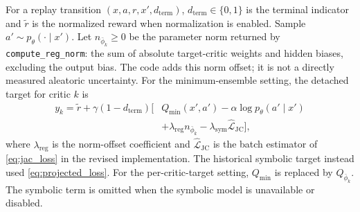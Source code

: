 For a replay transition \((x,a,r,x',d_{\mathrm{term}})\),
\(d_{\mathrm{term}}\in\{0,1\}\) is the terminal indicator and \(\widetilde r\)
is the normalized reward when normalization is enabled. Sample
\(a'\sim p_\theta(\cdot\mid x')\).
Let \(n_{\bar\phi_k}\geq0\) be the parameter norm returned by
\texttt{compute\_reg\_norm}: the sum of absolute target-critic weights and
hidden biases, excluding the output bias. The code adds this norm offset;
it is not a directly measured aleatoric uncertainty.
For the minimum-ensemble setting, the detached target for critic \(k\) is
\begin{equation}
\begin{split}
y_k=\widetilde r+\gamma(1-d_{\mathrm{term}})\big[
&Q_{\min}(x',a')-\alpha\log p_\theta(a'\mid x')\\
&+\lambda_{\mathrm{reg}}n_{\bar\phi_k}
-\lambda_{\mathrm{sym}}\widehat{\mathcal L}_{\mathrm{JC}}\big],
\end{split}
\label{eq:critic_target}
\end{equation}
where \(\lambda_{\mathrm{reg}}\) is the norm-offset coefficient and
\(\widehat{\mathcal L}_{\mathrm{JC}}\) is the batch estimator of
\eqref{eq:jac_loss} in the revised implementation. The historical symbolic
target instead used \eqref{eq:projected_loss}. For the per-critic-target setting,
\(Q_{\min}\) is replaced by \(Q_{\bar\phi_k}\).
The symbolic term is omitted when the symbolic model is unavailable or disabled.

